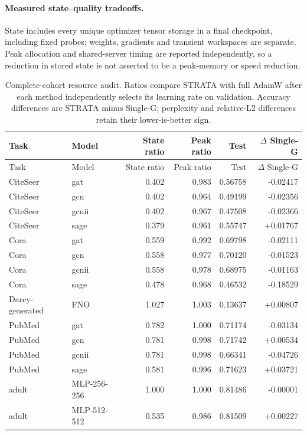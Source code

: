 \paragraph{Measured state--quality tradeoffs.} State includes every unique optimizer tensor storage in a final checkpoint, including fixed probes; weights, gradients and transient workspaces are separate. Peak allocation and shared-server timing are reported independently, so a reduction in stored state is not asserted to be a peak-memory or speed reduction.
{\footnotesize\setlength{\tabcolsep}{3pt}\begin{longtable}{llrrrr}\caption{Complete-cohort resource audit. Ratios compare STRATA with full AdamW after each method independently selects its learning rate on validation. Accuracy differences are STRATA minus Single-G; perplexity and relative-L2 differences retain their lower-is-better sign.}\\\toprule Task & Model & State ratio & Peak ratio & Test & $\Delta$ Single-G\\\midrule\endfirsthead\toprule Task & Model & State ratio & Peak ratio & Test & $\Delta$ Single-G\\\midrule\endhead
CiteSeer & gat & 0.402 & 0.983 & 0.56758 & -0.02417 \\
CiteSeer & gcn & 0.402 & 0.964 & 0.49199 & -0.02356 \\
CiteSeer & gcnii & 0.402 & 0.967 & 0.47508 & -0.02366 \\
CiteSeer & sage & 0.379 & 0.961 & 0.55747 & +0.01767 \\
Cora & gat & 0.559 & 0.992 & 0.69798 & -0.02111 \\
Cora & gcn & 0.558 & 0.977 & 0.70120 & -0.01523 \\
Cora & gcnii & 0.558 & 0.978 & 0.68975 & -0.01163 \\
Cora & sage & 0.478 & 0.968 & 0.46532 & -0.18529 \\
Darcy-generated & FNO & 1.027 & 1.003 & 0.13637 & +0.00807 \\
PubMed & gat & 0.782 & 1.000 & 0.71174 & -0.03134 \\
PubMed & gcn & 0.781 & 0.998 & 0.71742 & +0.00534 \\
PubMed & gcnii & 0.781 & 0.998 & 0.66341 & -0.04726 \\
PubMed & sage & 0.581 & 0.996 & 0.71623 & +0.03721 \\
adult & MLP-256-256 & 1.000 & 1.000 & 0.81486 & -0.00001 \\
adult & MLP-512-512 & 0.535 & 0.986 & 0.81509 & +0.00227 \\

\end{longtable}}
